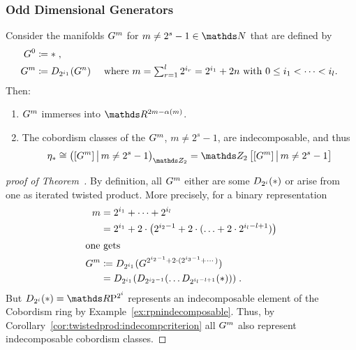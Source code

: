\subsubsection{Odd Dimensional Generators}
\begin{Thm}\label{thm:brownproof}
  Consider the manifolds $G^{m}$ for $m\neq 2^s-1\in\Nat$ that are
  defined by
  \begin{align*}
    G^{0} &\coloneqq * \;, \\
    G^{m} &\coloneqq D_{2^{i_1}}({G^{n}})
         &\text{
           where
           $\textstyle m=\sum_{r=1}^l 2^{i_r}=2^{i_1}+2n$
           with $0\leq i_1<\dotsb<i_l$.
           }
  \end{align*}
  Then:
  \begin{enumerate}
  \item\label{item:brownimmersionproperty}
    $G^{m}$ immerses into $\R^{2m-\alpha(m)}$.
  \item\label{item:indecomposabilityproperty}
    The cobordism classes of the $G^{m}$, $m\neq 2^s-1$, are
    indecomposable, and thus
    \begin{gather*}
      \c_*\cong \left( [\G m] \,\big|\, m\neq 2^s-1 \right)_{\Zmod2}
      = \Zmod2\left[[\G m] \,\big|\, m\neq 2^s-1\right]
    \end{gather*}
  \end{enumerate}
\end{Thm}
\begin{proof}[proof of
  Theorem~]
  By definition, all $G^{m}$ either are some $D_{2^i}({*})$
  or arise from one as iterated twisted product. More precisely, for a binary
  representation
  \begin{align*}
    m &= 2^{i_1}+\dotsb + 2^{i_l} \\
      &= 2^{i_1}+ 2\cdot\big( 2^{i_2-1} + 2\cdot(\dotsc + 2\cdot 2^{i_l-l+1})\big)
    \\\intertext{one gets}
    G^{m} &\coloneqq
           D_{2^{i_1}}({G^{2^{i_2-1} + 2\cdot(2^{i_3-1}+\dotsb)}})\\
      &= D_{2^{i_1}}({
        D_{2^{i_2-1}}({
        \dotsc
        D_{2^{i_l-l+1}}({*})
        })})
        \;.
  \end{align*}
  But $\Twistedprod{2^{i}}{\pt}=\RP{2^i}$ represents an indecomposable
  element of the Cobordism ring by Example~\ref{ex:rpnindecomposable}.
  Thus, by Corollary~\ref{cor:twistedprod:indecompcriterion} all
  $G^{m}$ also represent indecomposable cobordism classes.
\end{proof}
